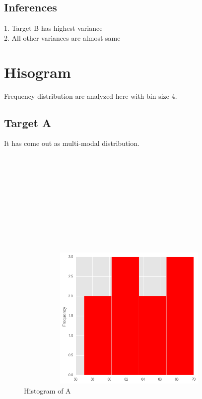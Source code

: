 \documentclass[11pt]{report}
\begin{document}
\subsection{Inferences}
1. Target B has highest variance \\
2. All other variances are almost same\\

\section{Hisogram}
Frequency distribution are analyzed here with bin size 4.
\subsection{Target A}
It has come out as multi-modal distribution.\\
\\
\\
\\
\\
\\
\\
\\
\\
\\
\\

\begin{figure}[h!]
  \centering
  \includegraphics[height = 7cm, width = 14cm]{A_hist.png}
  \caption{Histogram of A}
  \label{fig:hist_a}
\end{figure}
\end{document}
